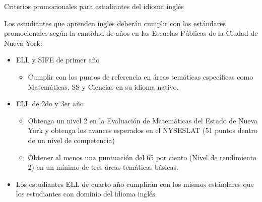 \documentclass[12pt,letterpaper]{article}
\begin{document}
Criterios promocionales para estudiantes del idioma inglés

Los estudiantes que aprenden inglés deberán cumplir con los estándares promocionales según la cantidad de años en las Escuelas Públicas de la Ciudad de Nueva York:
\pagebreak
\vspace*{1.5cm}
\begin{itemize}
\item ELL y SIFE de primer año
	\begin{itemize}
	\item Cumplir con los puntos de referencia en áreas temáticas específicas como Matemáticas, SS y Ciencias en su idioma nativo.
	\end{itemize}
\item ELL de 2do y 3er año
	\begin{itemize}
	\item Obtenga un nivel 2 en la Evaluación de Matemáticas del Estado de Nueva York y obtenga los avances esperados en el NYSESLAT (51 puntos dentro de un nivel de competencia)
	\item Obtener al menos una puntuación del 65 por ciento (Nivel de rendimiento 2) en un mínimo de tres áreas temáticas básicas.
	\end{itemize}
\item Los estudiantes ELL de cuarto año cumplirán con los mismos estándares que los estudiantes con dominio del idioma inglés.
\end{itemize}
\end{document}
